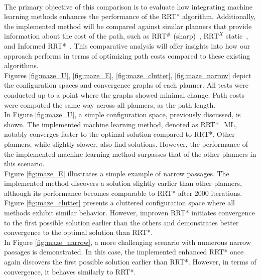 \documentclass{ctuthesis}
\begin{document}
\\
The primary objective of this comparison is to evaluate how integrating 
machine learning methods enhances the performance of the RRT* algorithm. 
Additionally, 
the implemented method will be compared against similar planners that provide 
information about the cost of the path, 
such as RRT$^\#$ (sharp)~\cite{arslan2012rrtsharp}, $\text{RRT}^X$ static~\cite{Otte2015RRTX}, 
and Informed RRT*~\cite{Gammell2018InformedRRTstar}. 
This comparative analysis will offer insights into how our approach 
performs in terms of optimizing path costs compared to these existing algorithms. 
\\[12pt]
Figures \ref{fig:maze_U}, \ref{fig:maze_E}, \ref{fig:maze_clutter}, \ref{fig:maze_narrow} 
depict the configuration spaces and convergence graphs of each planner. 
All tests were conducted up to a point where the graphs showed minimal change.
Path costs were computed the same way across all planners, as the path length.
\\[12pt]
In Figure \ref{fig:maze_U}, 
a simple configuration space, previously discussed, is shown. 
The implemented machine learning method, denoted as RRT*\_ML, 
notably converges faster to the optimal solution compared to RRT*. 
Other planners, while slightly slower, also find solutions. 
However, the performance of the implemented machine learning method surpasses 
that of the other planners in this scenario.
\\[12pt]
Figure \ref{fig:maze_E} illustrates a simple example of narrow passages. 
The implemented method discovers a solution slightly earlier than other planners, 
although its performance becomes comparable to RRT* after 2000 iterations.
\\[12pt]
Figure \ref{fig:maze_clutter} presents a cluttered configuration space where all methods exhibit similar behavior. 
However, improven RRT* initiates convergence to the first possible solution earlier than the others and 
demonstrates better convergence to the optimal solution than RRT*.
\\[12pt]
In Figure \ref{fig:maze_narrow}, 
a more challenging scenario with numerous narrow passages is demonstrated. 
In this case, 
the implemented enhanced RRT* once again discovers the first possible solution earlier than RRT*. 
However, in terms of convergence, it behaves similarly to RRT*.
\end{document}
